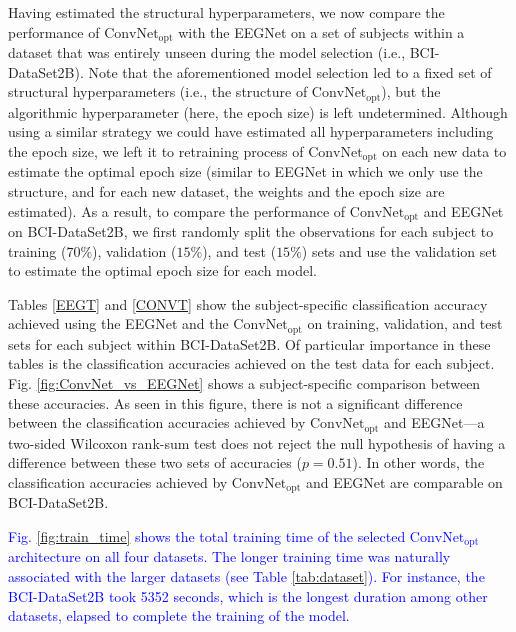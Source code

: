 \documentclass{ieeeaccess}
\begin{document}
{    Having estimated the structural hyperparameters, we now compare the performance of $\text{ConvNet}_{\text{opt}}$ with the EEGNet on a set of subjects within a dataset that was entirely unseen during the model selection (i.e., BCI-DataSet2B). Note that the aforementioned model selection led to a fixed set of structural hyperparameters (i.e., the structure of $\text{ConvNet}_{\text{opt}}$), but the algorithmic hyperparameter (here, the epoch size) is left undetermined. Although using a similar strategy we could have estimated all hyperparameters including the epoch size, we left it to retraining process of $\text{ConvNet}_{\text{opt}}$ on each new data to estimate the optimal epoch size (similar to EEGNet in which we only use the structure, and for each new dataset, the weights and the epoch size are estimated). As a result, to compare the performance of $\text{ConvNet}_{\text{opt}}$ and EEGNet on BCI-DataSet2B, we first randomly split the observations for each subject to training ($70\%$), validation ($15\%$), and test ($15\%$) sets and use the validation set to estimate the optimal epoch size for each model. 
    
    Tables \ref{EEGT} and \ref{CONVT} show the subject-specific classification accuracy achieved using the EEGNet and the $\text{ConvNet}_{\text{opt}}$ on training, validation, and test sets for each subject within BCI-DataSet2B. Of particular importance in these tables is the classification accuracies achieved on the test data for each subject. Fig. \ref{fig:ConvNet_vs_EEGNet} shows a subject-specific comparison between these accuracies. As seen in this figure, there is not a significant difference between the classification accuracies achieved by $\text{ConvNet}_{\text{opt}}$ and EEGNet---a two-sided Wilcoxon rank-sum test does not reject the null hypothesis of having a difference between these two sets of accuracies ($p=0.51$). In other words, the classification accuracies achieved by $\text{ConvNet}_{\text{opt}}$ and EEGNet are comparable on BCI-DataSet2B. 
 
    \textcolor{blue}{Fig. \ref{fig:train_time} shows the total training time of the selected  $\text{ConvNet}_{\text{opt}}$ architecture on all four datasets. The longer training time was naturally associated with the larger datasets (see Table \ref{tab:dataset}). For instance, the BCI-DataSet2B took 5352 seconds, which is the longest duration among other datasets, elapsed to complete the training of the model.}
     
}
\end{document}
